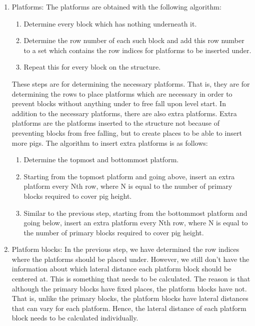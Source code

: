 \documentclass{dalthesis}
\begin{document}
\begin{enumerate}
\begin{enumerate}
    \item Platforms: The platforms are obtained with the following algorithm:

    \begin{enumerate}
      \item Determine every block which has nothing underneath it.
      \item Determine the row number of each such block and add this row number to a set which contains the row indices for platforms to be inserted under.
      \item Repeat this for every block on the structure.
    \end{enumerate}

    These steps are for determining the necessary platforms. That is, they are for determining the rows to place platforms which are necessary in order to prevent blocks without anything under to free fall upon level start. In addition to the necessary platforms, there are also extra platforms. Extra platforms are the platforms inserted to the structure not because of preventing blocks from free falling, but to create places to be able to insert more pigs. The algorithm to insert extra platforms is as follows:

    \begin{enumerate}
      \item Determine the topmost and bottommost platform.
      \item Starting from the topmost platform and going above, insert an extra platform every Nth row, where N is equal to the number of primary blocks required to cover pig height.
      \item Similar to the previous step, starting from the bottommost platform and going below, insert an extra platform every Nth row, where N is equal to the number of primary blocks required to cover pig height.
    \end{enumerate}

    \item Platform blocks: In the previous step, we have determined the row indices where the platforms should be placed under. However, we still don't have the information about which lateral distance each platform block should be centered at. This is something that needs to be calculated. The reason is that although the primary blocks have fixed places, the platform blocks have not. That is, unlike the primary blocks, the platform blocks have lateral distances that can vary for each platform. Hence, the lateral distance of each platform block needs to be calculated individually.


\end{enumerate}
\end{enumerate}
\end{document}
